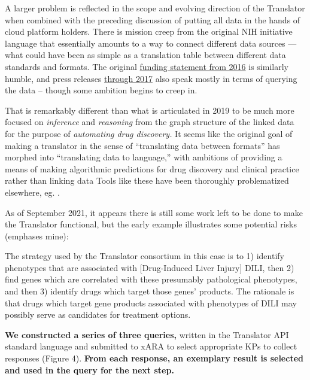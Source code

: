 \documentclass[10pt]{article}
\begin{document}
\begin{multicols}{2}
A larger problem is reflected in the scope and evolving direction of the
Translator when combined with the preceding discussion of putting all
data in the hands of cloud platform holders. There is mission creep from
the original NIH initiative language that essentially amounts to a way
to connect different data sources --- what could have been as simple as
a translation table between different data standards and formats. The
original
\href{https://web.archive.org/web/20210709100523/https://ncats.nih.gov/news/releases/2016/feasibility-assessment-translator}{funding
statement from 2016} is similarly humble, and press releases
\href{https://web.archive.org/web/20210709171335/https://ncats.nih.gov/pubs/features/translator}{through
2017} also speak mostly in terms of querying the data -- though some
ambition begins to creep in.

That is remarkably different than what is articulated in 2019 \cite{consortiumUniversalBiomedicalData2019}  to be much more focused on
\emph{inference} and \emph{reasoning} from the graph structure of the
linked data for the purpose of \emph{automating drug discovery.} It
seems like the original goal of making a translator in the sense of
``translating data between formats'' has morphed into ``translating data
to language,'' with ambitions of providing a means of making algorithmic
predictions for drug discovery and clinical practice rather than linking
data \cite{hailuNIHfundedProjectAims2019}  Tools like these have
been thoroughly problematized elsewhere, eg. \cite{groteEthicsAlgorithmicDecisionmaking2020, obermeyerDissectingRacialBias2019, panchArtificialIntelligenceAlgorithmic2019, panchInconvenientTruthAI2019} .

As of September 2021, it appears there is still some work left to be
done to make the Translator functional, but the early example
illustrates some potential risks (emphases mine):

\begin{leftbar}
The strategy used by the Translator consortium in this case is to 1)
identify phenotypes that are associated with {[}Drug-Induced Liver
Injury{]} DILI, then 2) find genes which are correlated with these
presumably pathological phenotypes, and then 3) identify drugs which
target those genes' products. The rationale is that drugs which target
gene products associated with phenotypes of DILI may possibly serve as
candidates for treatment options.

\textbf{We constructed a series of three queries,} written in the
Translator API standard language and submitted to xARA to select
appropriate KPs to collect responses (Figure 4). \textbf{From each
response, an exemplary result is selected and used in the query for the
next step.}


\end{leftbar}
\end{multicols}
\end{document}
